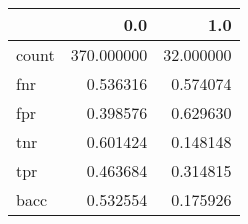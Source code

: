 \begin{tabular}{lrr}
\toprule
{} &         0.0 &        1.0 \\
\midrule
count &  370.000000 &  32.000000 \\
fnr   &    0.536316 &   0.574074 \\
fpr   &    0.398576 &   0.629630 \\
tnr   &    0.601424 &   0.148148 \\
tpr   &    0.463684 &   0.314815 \\
bacc  &    0.532554 &   0.175926 \\
\bottomrule
\end{tabular}
